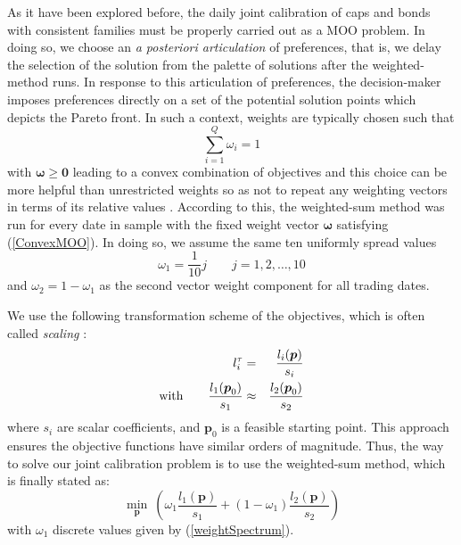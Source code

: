  As it have been explored before, the daily joint calibration of caps and
 bonds with consistent families must be properly carried out as a MOO
 problem. In doing so, we choose an {\sl a posteriori articulation} of
   preferences, that is, we delay the selection of the solution from
 the palette of solutions after the weighted-method runs. In response
 to this articulation of preferences, the decision-maker imposes
 preferences directly on a set of the potential solution points which
 depicts the Pareto front. In such a context, weights are typically
 chosen such that 
\begin{equation}
\label{ConvexMOO}
\sum_{i=1}^Q \omega_i=1
\end{equation}
with $\boldsymbol\omega\geq \boldsymbol 0$ leading to a convex
combination of objectives and this choice can be more helpful than
unrestricted weights so as not to repeat any weighting vectors in
terms of its relative values 
\cite[Sect. 5.3, pp. 73--74]{M:2005}. According to
this, the weighted-sum method was run for every date in sample with
the fixed weight vector $\boldsymbol{\omega}$ satisfying 
(\ref{ConvexMOO}). In doing so, we assume the same ten uniformly
spread values
\begin{equation}
\label{weightSpectrum}
\omega_1=\frac{1}{10}j  \qquad j=1,2,\dots,10
\end{equation}
and $\omega_2=1-\omega_1$ as the second vector weight component for
all trading dates.

We use the following transformation scheme of the objectives, which is
often called {\sl scaling} \cite{R:1987}:
\begin{eqnarray}
l_i^\tau&=& \frac{l_i(\boldsymbol p)}{s_i} \\
{\rm with}\qquad\frac{l_1 (\boldsymbol p_0)}{s_1}& \approx & \frac{l_2 (\boldsymbol p_0)}{s_2}
\end{eqnarray}
where $s_i$ are scalar coefficients, and $\boldsymbol p_0$ is a feasible starting
point. This approach ensures the objective functions have similar
orders of magnitude. Thus, the way to solve our joint calibration
problem is to use the weighted-sum method, which is finally stated as:
\begin{equation}
\label{finalMOO}
\underset{\boldsymbol p}{\min}\: \left( \omega_1 \frac{l_1(\boldsymbol
  p)}{s_1}+(1-\omega_1) \frac{l_2(\boldsymbol p)}{s_2} \right)
\end{equation}
with $\omega_1$ discrete values given by (\ref{weightSpectrum}).

